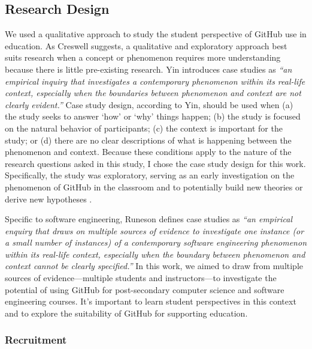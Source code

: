 \subsection{Research Design}
We used a qualitative approach to study the student perspective of GitHub use in education. As Creswell \cite{creswell2013research} suggests, a qualitative and exploratory approach best suits research when a concept or phenomenon requires more understanding because there is little pre-existing research. Yin \cite{yin2013case} introduces case studies as \textit{``an empirical inquiry that investigates a contemporary phenomenon within its real-life context, especially when the boundaries between phenomenon and context are not clearly evident.''} Case study design, according to Yin, should be used when (a) the study seeks to answer `how' or `why' things happen; (b) the study is focused on the natural behavior of participants; (c) the context is important for the study; or (d) there are no clear descriptions of what is happening between the phenomenon and context. Because these conditions apply to the nature of the research questions asked in this study, I chose the case study design for this work. Specifically, the study was exploratory, serving as an early investigation on the phenomenon of GitHub in the classroom and to potentially build new theories or derive new hypotheses \cite{easterbrook2008selecting}.

Specific to software engineering, Runeson \cite{runeson2012case} defines case studies as \textit{``an empirical enquiry that draws on multiple sources of evidence to investigate one instance (or a small number of instances) of a contemporary software engineering phenomenon within its real-life context, especially when the boundary between phenomenon and context cannot be clearly specified.''} In this work, we aimed to draw from multiple sources of evidence---multiple students and instructors---to investigate the potential of using GitHub for post-secondary computer science and software engineering courses. It's important to learn student perspectives in this context and to explore the suitability of GitHub for supporting education.

\subsubsection{Recruitment}

